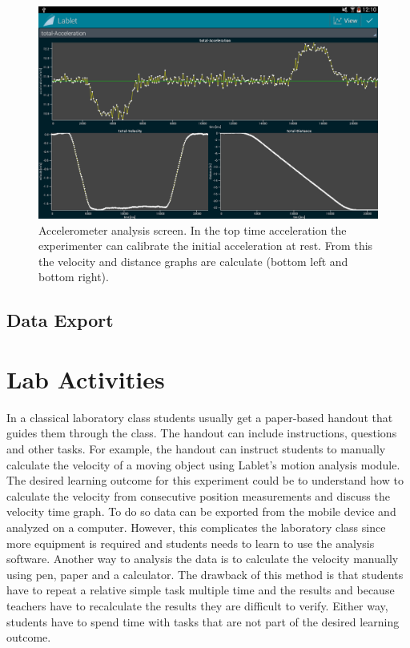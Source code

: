 \documentclass{sigchi}
\begin{document}
\begin{figure}
  \centering
  \includegraphics[width=.99\columnwidth]{AccelerometerAnalysis}
  \caption{Accelerometer analysis screen.  In the top time
    acceleration the experimenter can calibrate the initial
    acceleration at rest.  From this the velocity and distance graphs
    are calculate (bottom left and bottom
    right).\label{fig:AccelerometerAnalysis} }
\end{figure}

\subsection{Data Export}


\section{Lab Activities}
In a classical laboratory class students usually get a paper-based
handout that guides them through the class.  The handout can include
instructions, questions and other tasks.  For example, the handout can
instruct students to manually calculate the velocity of a moving
object using Lablet's motion analysis module.  The desired learning
outcome for this experiment could be to understand how to calculate
the velocity from consecutive position measurements and discuss the
velocity time graph.  To do so data can be exported from the mobile
device and analyzed on a computer.  However, this complicates the
laboratory class since more equipment is required and students needs
to learn to use the analysis software.  Another way to analysis the
data is to calculate the velocity manually using pen, paper and a
calculator.  The drawback of this method is that students have to
repeat a relative simple task multiple time and the results and
because teachers have to recalculate the results they are difficult to
verify.  Either way, students have to spend time with tasks that are
not part of the desired learning outcome.
\end{document}
